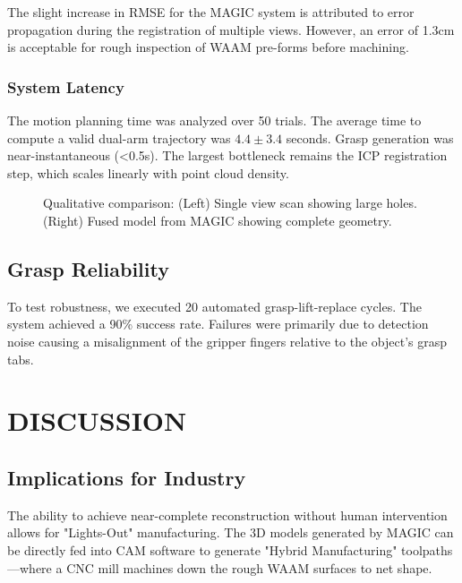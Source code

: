 \documentclass[letterpaper, 10 pt, conference]{ieeeconf}  %
\begin{document}
The slight increase in RMSE for the MAGIC system is attributed to error propagation during the registration of multiple views. However, an error of 1.3cm is acceptable for rough inspection of WAAM pre-forms before machining.

\subsubsection{System Latency}
The motion planning time was analyzed over 50 trials. The average time to compute a valid dual-arm trajectory was $4.4 \pm 3.4$ seconds. Grasp generation was near-instantaneous (<0.5s). The largest bottleneck remains the ICP registration step, which scales linearly with point cloud density.

\begin{figure}[thpb]
   \centering
   \framebox{\parbox{3in}{}}
   \caption{Qualitative comparison: (Left) Single view scan showing large holes. (Right) Fused model from MAGIC showing complete geometry.}
   \label{fig:qualitative}
\end{figure}

\subsection{Grasp Reliability}
To test robustness, we executed 20 automated grasp-lift-replace cycles. The system achieved a 90\% success rate. Failures were primarily due to detection noise causing a misalignment of the gripper fingers relative to the object's grasp tabs.

\section{DISCUSSION}

\subsection{Implications for Industry}
The ability to achieve near-complete reconstruction without human intervention allows for "Lights-Out" manufacturing. The 3D models generated by MAGIC can be directly fed into CAM software to generate "Hybrid Manufacturing" toolpaths—where a CNC mill machines down the rough WAAM surfaces to net shape.
\end{document}

